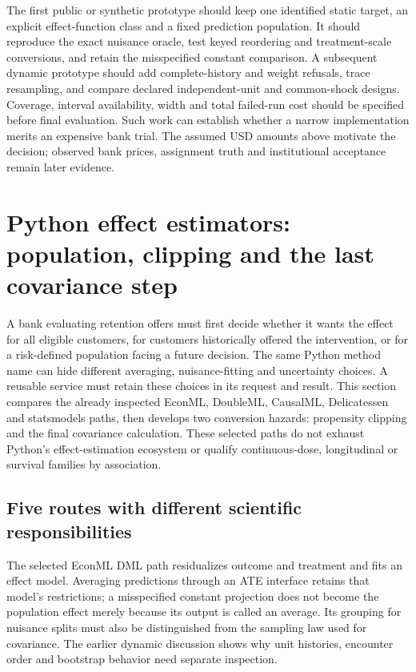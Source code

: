 The first public or synthetic prototype should keep one identified static
target, an explicit effect-function class and a fixed prediction population.
It should reproduce the exact nuisance oracle, test keyed reordering and
treatment-scale conversions, and retain the misspecified constant comparison.
A subsequent dynamic prototype should add complete-history and weight
refusals, trace resampling, and compare declared independent-unit and
common-shock designs. Coverage, interval availability, width and total
failed-run cost should be specified before final evaluation. Such work can
establish whether a narrow implementation merits an expensive bank trial.
The assumed USD amounts above motivate the decision; observed bank prices,
assignment truth and institutional acceptance remain later evidence.
\citep{exec19_econml_reference}


\section{Python effect estimators: population, clipping and the last covariance step}
\label{exec20:pyfx-scope}
A bank evaluating retention offers must first decide whether it wants the
effect for all eligible customers, for customers historically offered the
intervention, or for a risk-defined population facing a future decision.
The same Python method name can hide different averaging, nuisance-fitting
and uncertainty choices. A reusable service must retain these choices in
its request and result. This section compares the already inspected EconML,
DoubleML, CausalML, Delicatessen and statsmodels paths, then develops two
conversion hazards: propensity clipping and the final covariance calculation.
These selected paths do not exhaust Python's effect-estimation ecosystem or
qualify continuous-dose, longitudinal or survival families by association.

\subsection{Five routes with different scientific responsibilities}
\label{exec20:pyfx-routes}
The selected EconML DML path residualizes outcome and treatment and fits an
effect model. Averaging predictions through an ATE interface retains that
model's restrictions; a misspecified constant projection does not become
the population effect merely because its output is called an average.
Its grouping for nuisance splits must also be distinguished from the
sampling law used for covariance. The earlier dynamic discussion shows why
unit histories, encounter order and bootstrap behavior need separate
inspection.~\citep{exec19_econml_source}

